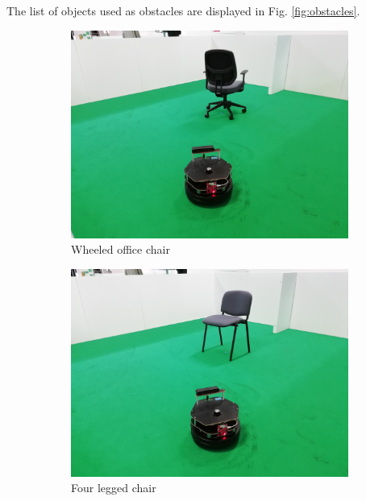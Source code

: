 The list of objects used as obstacles are displayed in Fig. \ref{fig:obstacles}.

\begin{figure}[h!]
  \centering
  \begin{subfigure}[b]{0.3\linewidth}
    \includegraphics[width=\linewidth]{imgs/chapter5/wchair.jpg}
     \caption{Wheeled office chair}
     \label{fig::wchair}
  \end{subfigure}
  \begin{subfigure}[b]{0.3\linewidth}
    \includegraphics[width=\linewidth]{imgs/chapter5/nchair.jpg}
    \caption{Four legged chair}
    \label{fig::nchair}
  \end{subfigure}
  \begin{subfigure}[b]{0.3\linewidth}

\end{subfigure}
\end{figure}
